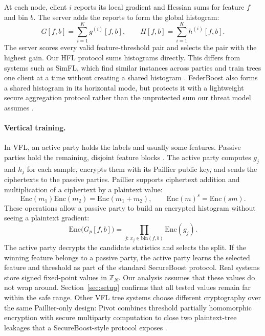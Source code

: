 \documentclass[11pt]{article}
\begin{document}
At each node, client $i$ reports its local gradient and Hessian sums for feature $f$ and bin $b$. The server adds the reports to form the global histogram:
\begin{equation}
G[f,b] = \sum_{i=1}^K g^{(i)}[f,b], \qquad
H[f,b] = \sum_{i=1}^K h^{(i)}[f,b].
\label{eq:hflagg}
\end{equation}
The server scores every valid feature-threshold pair and selects the pair with the highest gain. Our HFL protocol sums histograms directly. This differs from systems such as SimFL, which find similar instances across parties and train trees one client at a time without creating a shared histogram \cite{li2020fedgbdt}. FederBoost also forms a shared histogram in its horizontal mode, but protects it with a lightweight secure aggregation protocol rather than the unprotected sum our threat model assumes \cite{tian2020federboost}.

\paragraph{Vertical training.}
In VFL, an active party holds the labels and usually some features. Passive parties hold the remaining, disjoint feature blocks \cite{cheng2021secureboost}. The active party computes $g_j$ and $h_j$ for each sample, encrypts them with its Paillier public key, and sends the ciphertexts to the passive parties. Paillier supports ciphertext addition and multiplication of a ciphertext by a plaintext value:
\begin{equation}
\mathrm{Enc}(m_1)\mathrm{Enc}(m_2)=\mathrm{Enc}(m_1+m_2), \qquad
\mathrm{Enc}(m)^s=\mathrm{Enc}(sm).
\label{eq:paillier}
\end{equation}
These operations allow a passive party to build an encrypted histogram without seeing a plaintext gradient:
\begin{equation}
\mathrm{Enc}\bigl(G_p[f,b]\bigr)
= \prod_{j:\,x_j\in\mathrm{bin}(f,b)} \mathrm{Enc}(g_j).
\label{eq:vflagg}
\end{equation}
The active party decrypts the candidate statistics and selects the split. If the winning feature belongs to a passive party, the active party learns the selected feature and threshold as part of the standard SecureBoost protocol. Real systems store signed fixed-point values in $\mathbb{Z}_N$. Our analysis assumes that these values do not wrap around. Section~\ref{sec:setup} confirms that all tested values remain far within the safe range. Other VFL tree systems choose different cryptography over the same Paillier-only design: Pivot combines threshold partially homomorphic encryption with secure multiparty computation to close two plaintext-tree leakages that a SecureBoost-style protocol exposes \cite{wu2020pivot}.
\end{document}
